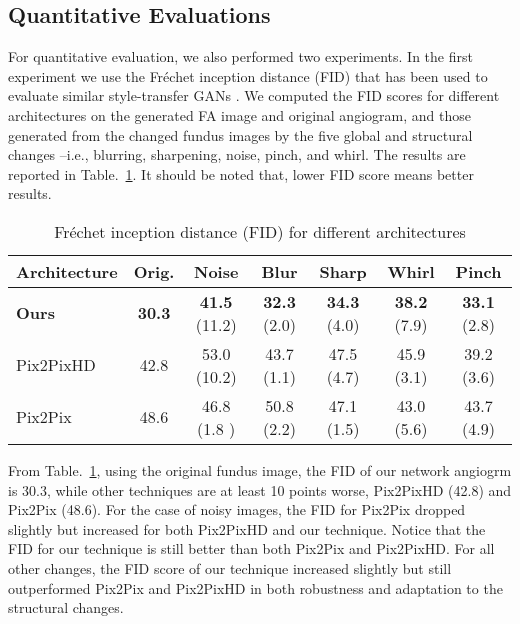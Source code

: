 \documentclass[runningheads]{llncs}
\begin{document}
\subsection{Quantitative Evaluations}
\label{subsec:qual}

For quantitative evaluation, we also performed two experiments. In the first experiment we use the Fréchet inception distance (FID) \cite{heusel2017gans} that has been used to evaluate similar style-transfer GANs \cite{karras2019style}. We computed the FID scores for different architectures on the generated FA image and original angiogram, and those generated from the changed fundus images by the five global and structural changes --i.e., blurring, sharpening, noise, pinch, and whirl. The results are reported in Table.~\ref{table2}. It should be noted that, lower FID score means better results. 

\begin{table}[htb]
\caption{Fréchet inception distance (FID) for different architectures}
    \label{table2}
\centering
\begin{tabular}{l|c|c|c|c|c|c} 
\hline
\small Architecture & \small Orig. & \small Noise & \small Blur & \small Sharp & \small Whirl & \small Pinch \\
\hline
\small \textbf{Ours} & \small\textbf{ 30.3} & \small \textbf{41.5 }(11.2) & \small \textbf{32.3} (2.0) & \small \textbf{34.3} (4.0) & \small \textbf{38.2} (7.9) & \small \textbf{33.1} (2.8) \\ 

\small Pix2PixHD \cite{wang2018high} & \small 42.8  &  \small 53.0 (10.2)& \small 43.7 (1.1) & \small 47.5 (4.7) & \small 45.9 (3.1) & \small 39.2 (3.6) \\ 
\small Pix2Pix \cite{isola2017image} & \small 48.6  &  \small 46.8 (1.8 )& \small 50.8 (2.2)& \small 47.1 (1.5) & \small 43.0 (5.6)& \small 43.7 (4.9) \\ 
\hline
\end{tabular}
\end{table}

From Table.~\ref{table2}, using the original fundus image, the FID of our network angiogrm is 30.3, while other techniques are at least 10 points worse, Pix2PixHD (42.8) and Pix2Pix (48.6). For the case of noisy images, the FID for Pix2Pix dropped slightly but increased for both Pix2PixHD and our technique. Notice that the FID for our technique is still better than both Pix2Pix and Pix2PixHD. For all other changes, the FID score of our technique increased slightly but still outperformed Pix2Pix and Pix2PixHD in both robustness and adaptation to the structural changes.
\end{document}
